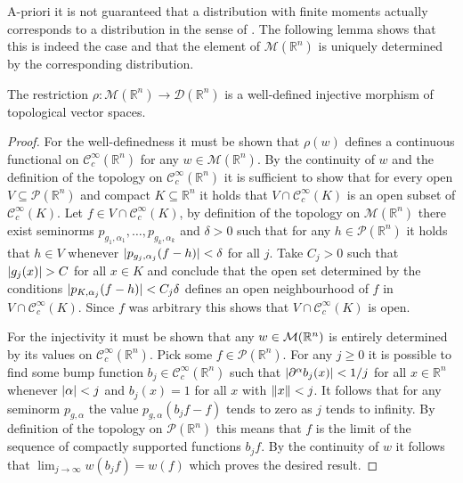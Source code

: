 A-priori it is not guaranteed that a distribution with finite moments actually corresponds to a distribution in the sense of .
The following lemma shows that this is indeed the case and that the element of $\mathcal{M}(\mathbb{R}^n)$ is uniquely determined by the corresponding distribution.
\begin{lemma}
  The restriction $\rho: \mathcal{M}(\mathbb{R}^n)\to \mathcal{D}(\mathbb{R}^n)$
  is a well-defined injective morphism of topological vector spaces.
\end{lemma}
\begin{proof}
   For the well-definedness it must be shown that $\rho(w)$ defines a continuous functional on $\mathcal{C}_c^\infty(\mathbb{R}^n)$ for any $w\in \mathcal{M}(\mathbb{R}^n)$.
   By the continuity of $w$ and the definition of the topology on $\mathcal{C}_c^\infty(\mathbb{R}^n)$ it is sufficient to show that for every open $V\subseteq \mathcal{P}(\mathbb{R}^n)$ and compact $K\subseteq \mathbb{R}^n$ it holds that $V\cap \mathcal{C}_c^\infty(K)$ is an open subset of $\mathcal{C}_c^\infty(K)$.
   Let $f\in V\cap \mathcal{C}_c^\infty(K)$, by definition of the topology on $\mathcal{M}(\mathbb{R}^n)$ there exist seminorms $p_{g_1,\alpha_1},\ldots,p_{g_k,\alpha_k}$ and $\delta >0$ such that for any $h\in\mathcal{P}(\mathbb{R}^n)$ it holds that $h\in V$ whenever $\vert p_{g_j,\alpha_j}(f-h) \vert<\delta$ for all $j$.
   Take $C_j>0$ such that $\vert g_j(x) \vert>C$ for all $x\in K$ and conclude that the open set determined by the conditions $\vert p_{K,\alpha_j}(f-h) \vert<C_j\delta$ defines an open neighbourhood of $f$ in $V\cap\mathcal{C}_c^\infty(K)$.
   Since $f$ was arbitrary this shows that $V\cap\mathcal{C}_c^\infty(K)$ is open.

   For the injectivity it must be shown that any $w\in \mathcal{M}(\mathbb{R}^n)$ is entirely determined by its values on $\mathcal{C}_c^\infty(\mathbb{R}^n)$.
   Pick some $f\in \mathcal{P}(\mathbb{R}^n)$.
   For any $j\geq 0$ it is possible to find some bump function $b_j\in \mathcal{C}_c^\infty(\mathbb{R}^n)$ such that $\vert \partial^\alpha b_j(x) \vert<1/j$ for all $x\in\mathbb{R}^n$ whenever $\vert \alpha \vert <j$ and $b_j(x) = 1$ for all $x$ with $\Vert x \Vert<j$.
   It follows that for any seminorm $p_{g,\alpha}$ the value $p_{g,\alpha}(b_jf - f)$ tends to zero as $j$ tends to infinity.
   By definition of the topology on $\mathcal{P}(\mathbb{R}^n)$ this means that $f$ is the limit of the sequence of compactly supported functions $b_jf$.
   By the continuity of $w$ it follows that $\lim_{j\to \infty} w(b_jf) = w(f)$ which proves the desired result.


\end{proof}
